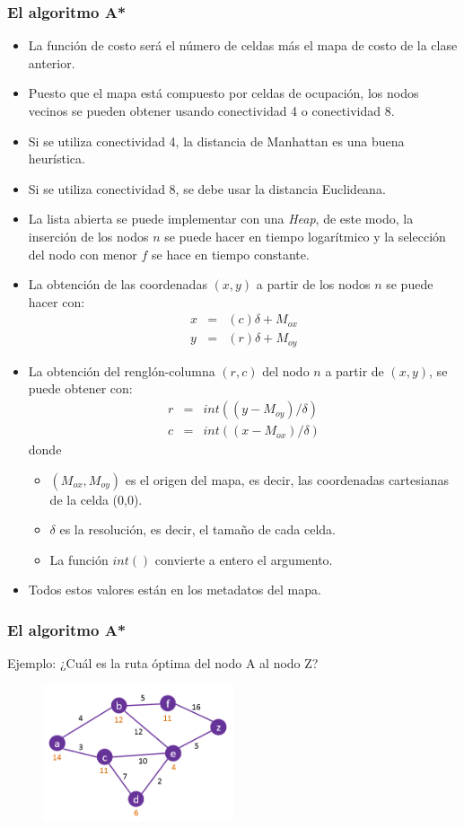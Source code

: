 \begin{frame}\frametitle{El algoritmo A*}
  \begin{itemize}
  \item La función de costo será el número de celdas más el mapa de costo de la clase anterior.
  \item Puesto que el mapa está compuesto por celdas de ocupación, los nodos vecinos se pueden obtener usando conectividad 4 o conectividad 8.
  \item Si se utiliza conectividad 4, la distancia de Manhattan es una buena heurística.
  \item Si se utiliza conectividad 8, se debe usar la distancia Euclideana.
  \item La lista abierta se puede implementar con una \textit{Heap}, de este modo, la inserción de los nodos $n$ se puede hacer en tiempo logarítmico y la selección del nodo con menor $f$ se hace en tiempo constante.
  \item La obtención de las coordenadas $(x,y)$ a partir de los nodos $n$ se puede hacer con:
    \begin{eqnarray*}
      x &=& (c)\delta + M_{ox}\\
      y &=& (r)\delta + M_{oy}
    \end{eqnarray*}
  \item La obtención del renglón-columna $(r,c)$ del nodo $n$ a partir de $(x,y)$, se puede obtener con:
    \begin{eqnarray*}
      r &=& int((y - M_{oy})/\delta)\\
      c &=& int((x - M_{ox})/\delta)
    \end{eqnarray*}
    donde
    \begin{itemize}
    \item $(M_{ox}, M_{oy})$ es el origen del mapa, es decir, las coordenadas cartesianas de la celda (0,0).
    \item $\delta$ es la resolución, es decir, el tamaño de cada celda.
    \item La función $int()$ convierte a entero el argumento. 
    \end{itemize}
    \item Todos estos valores están en los metadatos del mapa. 
  \end{itemize}
\end{frame}

\begin{frame}\frametitle{El algoritmo A*}
  Ejemplo: ¿Cuál es la ruta óptima del nodo A al nodo Z?
  \begin{figure}
    \centering
    \includegraphics[width=0.5\textwidth]{Figures/AStarExample.png}
  \end{figure}
\end{frame}

